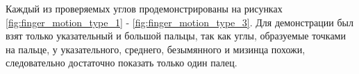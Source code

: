 \newpage

\hspace{0.6cm} Каждый из проверяемых углов продемонстрированы на рисунках \ref{fig:finger_motion_type_1} - \ref{fig:finger_motion_type_3}. Для демонстрации был взят только указательный и большой пальцы, так как углы, образуемые точками на пальце, у указательного, среднего, безымянного и мизинца похожи, следовательно достаточно показать только один палец.

\begin{figure}[H]
\begin{minipage}[h]{0.32\linewidth}
\end{minipage}
\hfill
\begin{minipage}[h]{0.32\linewidth}

\end{minipage}
\end{figure}
